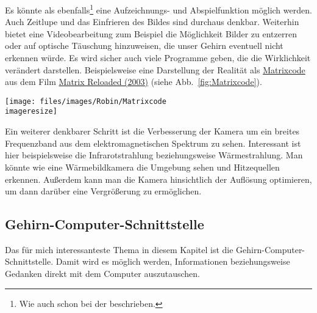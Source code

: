 
Es könnte als ebenfalls\footnote{Wie auch schon bei der
 beschrieben.} eine Aufzeichnungs- und Abspielfunktion möglich
werden. Auch Zeitlupe und das Einfrieren des Bildes sind durchaus denkbar. Weiterhin bietet eine
Videobearbeitung zum Beispiel die Möglichkeit Bilder zu entzerren oder auf optische Täuschung
hinzuweisen, die unser Gehirn eventuell nicht erkennen würde. Es wird sicher auch viele Programme
geben, die die Wirklichkeit verändert darstellen. Beispielsweise eine Darstellung der Realität als
\href{http://www.tony5m17h.net/MatrixCode.gif}{Matrixcode}
aus dem Film \href{http://www.imdb.de/title/tt0234215/}{Matrix Reloaded (2003)} (siehe
Abb.~\vref{fig:Matrixcode}).

\begin{figurewrapper} %
	\texttt{[image: files/images/Robin/Matrixcode\\imageresize]}
	\label{fig:Matrixcode}
\end{figurewrapper}

Ein weiterer denkbarer Schritt ist die Verbesserung der Kamera um ein breites Frequenzband aus dem
elektromagnetischen Spektrum zu sehen. Interessant ist hier beispielsweise die Infrarotstrahlung
beziehungsweise Wärmestrahlung. Man könnte wie eine Wärmebildkamera die Umgebung sehen und
Hitzequellen erkennen. Außerdem kann man die Kamera hinsichtlich der Auflösung optimieren, um dann
darüber eine Vergrößerung zu ermöglichen.%

\subsection{Gehirn-Computer-Schnittstelle}
\label{sec:Robin:future:BCI}
Das für mich interessanteste Thema in diesem Kapitel ist die Gehirn-Computer-Schnittstelle.
Damit wird
es möglich werden, Informationen beziehungsweise Gedanken direkt mit dem Computer auszutauschen.

